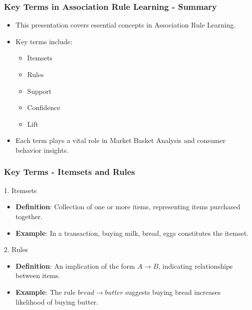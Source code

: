 \documentclass[aspectratio=169]{beamer}
\begin{document}
\begin{frame}[fragile]
    \frametitle{Key Terms in Association Rule Learning - Summary}
    \begin{itemize}
        \item This presentation covers essential concepts in Association Rule Learning.
        \item Key terms include:
          \begin{itemize}
              \item Itemsets
              \item Rules
              \item Support
              \item Confidence
              \item Lift
          \end{itemize}
        \item Each term plays a vital role in Market Basket Analysis and consumer behavior insights.
    \end{itemize}
\end{frame}

\begin{frame}[fragile]
    \frametitle{Key Terms - Itemsets and Rules}
    \begin{block}{1. Itemsets}
        \begin{itemize}
            \item \textbf{Definition}: Collection of one or more items, representing items purchased together.
            \item \textbf{Example}: In a transaction, buying {milk, bread, eggs} constitutes the itemset.
        \end{itemize}
    \end{block}
    
    \begin{block}{2. Rules}
        \begin{itemize}
            \item \textbf{Definition}: An implication of the form $A \to B$, indicating relationships between items.
            \item \textbf{Example}: The rule ${bread} \to {butter}$ suggests buying bread increases likelihood of buying butter.
        \end{itemize}
    \end{block}
\end{frame}
\end{document}
